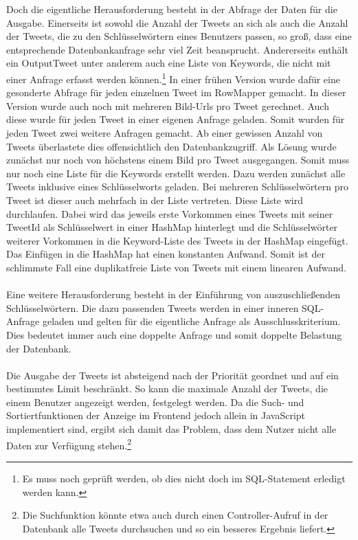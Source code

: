 Doch die eigentliche Herausforderung besteht in der Abfrage der Daten für die Ausgabe. Einerseits ist 
sowohl die Anzahl der Tweets an sich als auch die Anzahl der Tweets, die zu den Schlüsselwörtern eines 
Benutzers passen, so groß, dass eine entsprechende Datenbankanfrage sehr viel Zeit beansprucht. 
Andererseits enthält ein OutputTweet unter anderem auch eine Liste von Keywords, die nicht mit einer 
Anfrage erfasst werden können.\footnote{Es muss noch geprüft werden, ob dies nicht doch im SQL-Statement erledigt werden kann.}
In einer frühen Version wurde dafür eine gesonderte Abfrage für jeden einzelnen Tweet im RowMapper 
gemacht. In dieser Version wurde auch noch mit mehreren Bild-Urls pro Tweet gerechnet. Auch diese wurde 
für jeden Tweet in einer eigenen Anfrage geladen. Somit wurden für jeden Tweet zwei weitere Anfragen 
gemacht. Ab einer gewissen Anzahl von Tweets überlastete dies offensichtlich den Datenbankzugriff.
Als Lösung wurde zunächst nur noch von höchstens einem Bild pro Tweet ausgegangen. Somit muss nur noch 
eine Liste für die Keywords erstellt werden. Dazu werden zunächst alle Tweets inklusive eines 
Schlüsselworts geladen. Bei mehreren Schlüsselwörtern pro Tweet ist dieser auch mehrfach in der Liste 
vertreten. Diese Liste wird durchlaufen. Dabei wird das jeweils erste Vorkommen eines Tweets mit seiner 
TweetId als Schlüsselwert in einer HashMap hinterlegt und die Schlüsselwörter weiterer Vorkommen in die 
Keyword-Liste des Tweets in der HashMap eingefügt. Das Einfügen in die HashMap hat einen konstanten 
Aufwand. Somit ist der schlimmste Fall eine duplikatfreie Liste von Tweets mit einem linearen Aufwand.
\\\\
Eine weitere Herausforderung besteht in der Einführung von auszuschließenden Schlüsselwörtern. Die dazu 
passenden Tweets werden in einer inneren SQL-Anfrage geladen und gelten für die eigentliche Anfrage als 
Ausschlusskriterium. Dies bedeutet immer auch eine doppelte Anfrage und somit doppelte Belastung der 
Datenbank.
\\\\
Die Ausgabe der Tweets ist absteigend nach der Priorität geordnet und auf ein bestimmtes Limit beschränkt. 
So kann die maximale Anzahl der Tweets, die einem Benutzer angezeigt werden, festgelegt werden. Da die 
Such- und Sortiertfunktionen der Anzeige im Frontend jedoch allein in JavaScript implementiert sind, 
ergibt sich damit das Problem, dass dem Nutzer nicht alle Daten zur Verfügung stehen.\footnote{Die Suchfunktion könnte etwa auch durch einen Controller-Aufruf in der Datenbank alle Tweets durchsuchen und so ein besseres Ergebnis liefert.}








